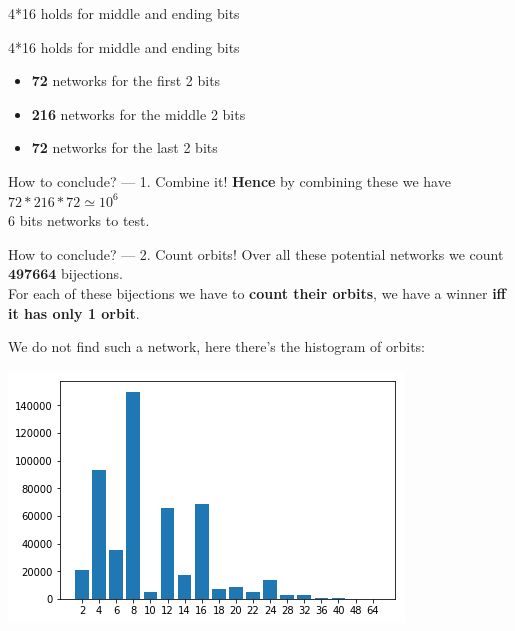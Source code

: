 \documentclass{beamer}
\begin{document}
\begin{frame}{4*16 holds for middle and ending bits}	
	\centering{}
\end{frame}

\begin{frame}{4*16 holds for middle and ending bits}
	\begin{itemize}
		\item \textbf{72} networks for the first 2 bits
		\item \textbf{216} networks for the middle 2 bits
		\item \textbf{72} networks for the last 2 bits
	\end{itemize}
\end{frame}

\begin{frame}{How to conclude? --- 1. Combine it!}
	\textbf{Hence} by combining these we have $72*216*72 \simeq 10^6$ \\ 6 bits networks to test.
\end{frame} 

\begin{frame}{How to conclude? --- 2. Count orbits!}
	Over all these potential networks we count $\boldsymbol{497664}$ bijections. \\
	For each of these bijections we have to \textbf{count their orbits}, we have a winner \textbf{iff it has only 1 orbit}.
	\medskip\pause
	
	We do not find such a network, here there's the histogram of orbits:
	
	\centering
	\includegraphics[scale=0.46]{hist_orbits.png}
\end{frame} 
\end{document}
